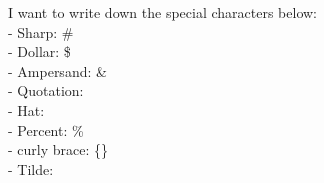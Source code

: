 \documentclass[a4paper, 12pt, onecolumn]{article}
\begin{document}
	
	\noindent
	I want to write down the special characters below:\\[8pt]
	\noindent
	- Sharp: 			\#		\\
	- Dollar: 			\$		\\
	- Ampersand: 	 	\&		\\
	- Quotation: 	 	\"		\\
	- Hat: 				\^ 		\\
	- Percent: 			\% 		\\
	- curly brace:		\{\} 	\\
	- Tilde:  			\~ 		\\
	
\end{document}
